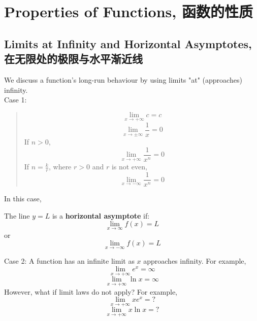 \section{Properties of Functions, 函数的性质}

\subsection{Limits at Infinity and Horizontal Asymptotes, 在无限处的极限与水平渐近线}
We discuss a function's long-run behaviour by using limits "at" (approaches) infinity. \\
Case 1:
\begin{quote}
    $$\lim_{x \to +\infty} c = c$$
    $$\lim_{x \to \pm \infty} \frac{1}{x} = 0$$
    If $n > 0$,
    $$\lim_{x \to +\infty} \frac{1}{x^n} = 0$$
    If $n = \frac{k}{r}$, where $r > 0$ and $r$ is not even,
    $$\lim_{x \to -\infty} \frac{1}{x^n} = 0$$
\end{quote}
In this case,
\begin{definition}
    The line $y=L$ is a \textbf{horizontal asymptote} if: \\
    $$\lim_{x \to \infty} f(x) = L$$
    or
    $$\lim_{x \to -\infty} f(x) = L$$
\end{definition}
Case 2: A function has an infinite limit as $x$ approaches infinity. For example,
$$\lim_{x \to +\infty} e^x = \infty$$
$$\lim_{x \to +\infty} \ln{x} = \infty$$
However, what if limit laws do not apply? For example,
$$\lim_{x \to +\infty} xe^x = ?$$
$$\lim_{x \to +\infty} x\ln{x} = ?$$

